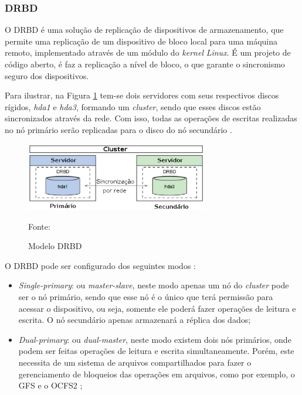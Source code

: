 \subsubsection{DRBD}
\label{section:drbd}
O \ac{DRBD} \cite{drbd} é uma solução de replicação de dispositivos de armazenamento, que permite uma replicação de um dispositivo de bloco local 
para uma máquina remoto, implementado através de um módulo do \textit{kernel} \textit{Linux}. É um projeto de código aberto, é faz a replicação a 
nível de bloco, o que garante o sincronismo seguro dos dispositivos. 

Para ilustrar, na Figura \ref{fig:drbd_basic} tem-se dois servidores com seus respectivos discos rígidos, \textit{hda1} e \textit{hda3}, formando 
um \textit{cluster}, sendo que esses discos estão sincronizados através da rede. Com isso, todas as operações de escritas realizadas no nó primário 
serão replicadas para o disco do nó secundário \cite{zaminhani2008}.

\begin{figure}[h!]
 \centering
 \includegraphics[width=300px]{img/drbd_basic.eps}
 \caption{Modelo DRBD}
 Fonte: \citet{jones2010}
 \label{fig:drbd_basic}
\end{figure}

O \ac{DRBD} pode ser configurado dos seguintes modos \cite{drbd}:
\begin{itemize}
 \item \textit{Single-primary}: ou \textit{master-slave}, neste modo apenas um nó do \textit{cluster} pode ser o nó primário, sendo que esse nó 
 é o único que terá permissão para acessar o dispositivo, ou seja, somente ele poderá fazer operações de leitura e escrita. O nó 
 secundário apenas armazenará a réplica dos dados;
 \item \textit{Dual-primary}: ou \textit{dual-master}, neste modo existem dois nós primários, onde podem ser feitas operações de leitura e escrita 
 simultaneamente. Porém, este necessita de um sistema de arquivos compartilhados para fazer o gerenciamento de bloqueios das operações em arquivos, 
 como por exemplo, o \ac{GFS} \cite{gfs} e o \ac{OCFS2} \cite{ocfs2};
\end{itemize}

